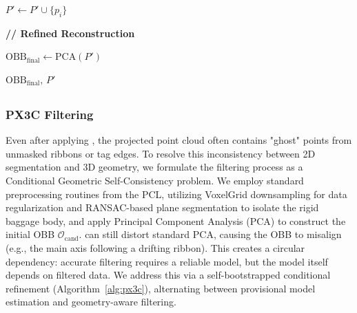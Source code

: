 \begin{algorithm}[t]
\begin{algorithmic}[1]

        \State $P' \gets P' \cup \{p_i\}$

    \EndIf

\EndFor

\State \textbf{// Refined Reconstruction}

\State $\mathrm{OBB}_{\text{final}} \gets \mathrm{PCA}(P')$

\State \Return $\mathrm{OBB}_{\text{final}},\,P'$

\end{algorithmic}
\end{algorithm}

\subsection{}
\noindent{}\par
\subsubsection{PX3C Filtering}
Even after applying  , the projected point cloud often contains "ghost" points from unmasked ribbons or tag edges. To resolve this inconsistency between 2D segmentation and 3D geometry, we formulate the filtering process as a Conditional Geometric Self-Consistency problem. We employ standard preprocessing routines from the PCL, utilizing VoxelGrid downsampling for data regularization and RANSAC-based plane segmentation to isolate the rigid baggage body, and apply Principal Component Analysis (PCA) to construct the initial OBB $\mathcal{O}_{\text{cand}}$.   can still distort standard PCA, causing the OBB to misalign (e.g., the main axis following a drifting ribbon). This creates a circular dependency: accurate filtering requires a reliable model, but the model itself depends on filtered data. We address this via a self-bootstrapped conditional refinement (Algorithm~\ref{alg:px3c}), alternating between provisional model estimation and geometry-aware filtering.

